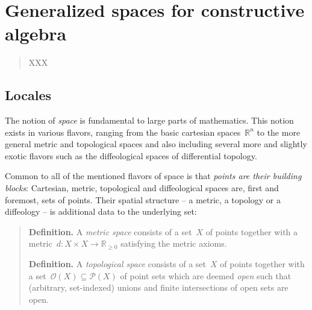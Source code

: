 \documentclass{ws-rv9x6}
\renewcommand{\O}{\mathcal{O}}
\newcommand{\RR}{\mathbb{R}}
\renewcommand{\P}{\mathcal{P}}
\renewcommand{\_}{\mathpunct{.}}
\newcommand{\?}{\,{:}\,}
\begin{document}
\chapter{Generalized spaces for constructive algebra}

\author[I. Blechschmidt]{Ingo Blechschmidt}

\address{Universität Augsburg \\
Institut für Mathematik \\
Universitätsstr. 14 \\
86159 Augsburg, Germany}

\begin{abstract}
XXX
\end{abstract}
\body

\tableofcontents

\section{Locales}


The notion of \emph{space} is fundamental to large parts of mathematics. This notion
exists in various flavors, ranging from the basic cartesian spaces~$\RR^n$ to
the more general metric and topological spaces and also including several more
and slightly exotic flavors such as the diffeological spaces of differential topology.

Common to all of the mentioned flavors of space is that \emph{points are their
building blocks}: Cartesian, metric, topological and diffeological spaces are,
first and foremost, sets of points. Their spatial structure -- a metric, a
topology or a diffeology -- is additional data to the underlying set:

\begin{quote}
\textbf{Definition.} A \emph{metric space} consists of a set~$X$ of points
together with a metric~$d : X \times X \to \RR_{\geq 0}$ satisfying the metric
axioms.

\textbf{Definition.} A \emph{topological space} consists of a set~$X$ of points
together with a set~$\O(X) \subseteq \P(X)$ of point sets which are deemed
\emph{open} such that (arbitrary, set-indexed) unions and finite intersections
of open sets are open.
\end{quote}
\end{document}
